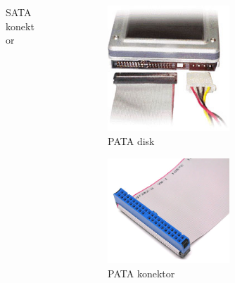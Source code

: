 \documentclass[croatian,t]{beamer} %
\begin{document}
\begin{frame}
\begin{columns}[c]
\begin{column}{4cm}
\begin{figure}
					\caption{SATA konektor}
				\end{figure}
			\end{column}
			\begin{column}{4cm}
				\begin{figure}
					\includegraphics[width=0.62\textwidth]{../pics/pata_disk.jpg}
					\caption{PATA disk}
				\end{figure}
   				\begin{figure}
					\includegraphics[width=0.62\textwidth]{../pics/pata_connector.jpg}
					\caption{PATA konektor}
				\end{figure}
			\end{column}
		\end{columns}
    \end{frame}
    
\end{document}
